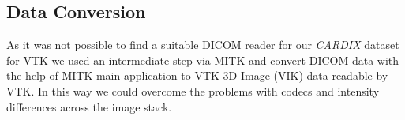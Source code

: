\subsection{Data Conversion}

As it was not possible to find a suitable DICOM reader for our \emph{CARDIX} dataset \cite{gimias_sampledata_2018} for VTK we used an intermediate step via MITK and convert DICOM data with the help of MITK main application to VTK 3D Image (VIK) data readable by VTK.
In this way we could overcome the problems with codecs and intensity differences across the image stack.


